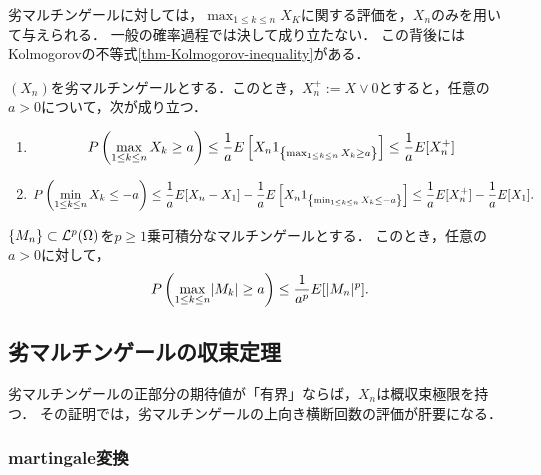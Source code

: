 \documentclass[uplatex,dvipdfmx]{jsreport}
\begin{document}
\begin{tcolorbox}[colframe=ForestGreen, colback=ForestGreen!10!white,breakable,colbacktitle=ForestGreen!40!white,coltitle=black,fonttitle=\bfseries\sffamily,
title=]
    劣マルチンゲールに対しては，$\max_{1\le k\le n}X_K$に関する評価を，$X_n$のみを用いて与えられる．
    一般の確率過程では決して成り立たない．
    この背後にはKolmogorovの不等式\ref{thm-Kolmogorov-inequality}がある．
\end{tcolorbox}

\begin{theorem}\label{thm-Doob-inequality}
    $(X_n)$を劣マルチンゲールとする．このとき，$X_n^+:=X\lor0$とすると，任意の$a>0$について，次が成り立つ．
    \begin{enumerate}
        \item \[P\left(\max_{1\le k\le n}X_k\ge a\right)\le\frac{1}{a}E\left[X_n1_{\left\{\max_{1\le k\le n}X_k\ge a\right\}}\right]\le\frac{1}{a}E[X_n^+]\]
        \item \[P\left(\min_{1\le k\le n}X_k\le -a\right)\le\frac{1}{a}E[X_n-X_1]-\frac{1}{a}E\left[X_n1_{\left\{\min_{1\le k\le n}X_k\le -a\right\}}\right]\le\frac{1}{a}E[X_n^+]-\frac{1}{a}E[X_1].\]
    \end{enumerate}
\end{theorem}

\begin{corollary}
    $\{M_n\}\subset\mathcal{L}^p(\Omega)$を$p\ge1$乗可積分なマルチンゲールとする．
    このとき，任意の$a>0$に対して，
    \[P\left(\max_{1\le k\le n}\lvert M_k\rvert\ge a\right)\le\frac{1}{a^p}E[\lvert M_n\rvert^p].\]
\end{corollary}

\subsection{劣マルチンゲールの収束定理}

\begin{tcolorbox}[colframe=ForestGreen, colback=ForestGreen!10!white,breakable,colbacktitle=ForestGreen!40!white,coltitle=black,fonttitle=\bfseries\sffamily,
title=]
    劣マルチンゲールの正部分の期待値が「有界」ならば，$X_n$は概収束極限を持つ．
    その証明では，劣マルチンゲールの上向き横断回数の評価が肝要になる．
\end{tcolorbox}

\subsubsection{martingale変換}
\end{document}
